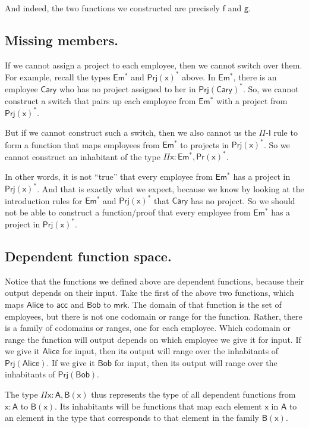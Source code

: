 \documentclass{article}
\newcommand\term{\mathsf}
\def\Intro/{\term{I}}
\def\PiBinder/{\Pi}
\newcommand\depfunc[3]{\term{\PiBinder/ #1 : #2, #3}}
\def\PiI/{$\PiBinder/$-$\Intro/$}
\begin{document}
And indeed, the two functions we constructed are precisely $\term{f}$ and $\term{g}$.


\subsection{Missing members.}

If we cannot assign a project to each employee, then we cannot switch over them. For example, recall the types $\term{Em^{*}}$ and $\term{Prj(x)^{*}}$ above. In $\term{Em^{*}}$, there is an employee $\term{Cary}$ who has no project assigned to her in $\term{Prj(Cary)^{*}}$. So, we cannot construct a switch that pairs up each employee from $\term{Em^{*}}$ with a project from $\term{Prj(x)^{*}}$.

But if we cannot construct such a switch, then we also cannot us the \PiI/ rule to form a function that maps employees from $\term{Em^{*}}$ to projects in $\term{Prj(x)^{*}}$. So we cannot construct an inhabitant of the type $\depfunc{x}{Em^{*}}{Pr(x)^{*}}$. 

In other words, it is not ``true'' that every employee from $\term{Em^{*}}$ has a project in $\term{Prj(x)^{*}}$. And that is exactly what we expect, because we know by looking at the introduction rules for $\term{Em^{*}}$ and $\term{Prj(x)^{*}}$ that $\term{Cary}$ has no project. So we should not be able to construct a function/proof that every employee from $\term{Em^{*}}$ has a project in $\term{Prj(x)^{*}}$.


\subsection{Dependent function space.}

Notice that the functions we defined above are dependent functions, because their output depends on their input. Take the first of the above two functions, which maps $\term{Alice}$ to $\term{acc}$ and $\term{Bob}$ to $\term{mrk}$. The domain of that function is the set of employees, but there is not one codomain or range for the function. Rather, there is a family of codomains or ranges, one for each employee. Which codomain or range the function will output depends on which employee we give it for input. If we give it $\term{Alice}$ for input, then its output will range over the inhabitants of $\term{Prj(Alice)}$. If we give it $\term{Bob}$ for input, then its output will range over the inhabitants of $\term{Prj(Bob)}$.

The type $\depfunc{x}{A}{B(x)}$ thus represents the type of all dependent functions from $\term{x} : \term{A}$ to $\term{B(x)}$. Its inhabitants will be functions that map each element $\term{x}$ in $\term{A}$ to an element in the type that corresponds to that element in the family $\term{B(x)}$.
\end{document}
